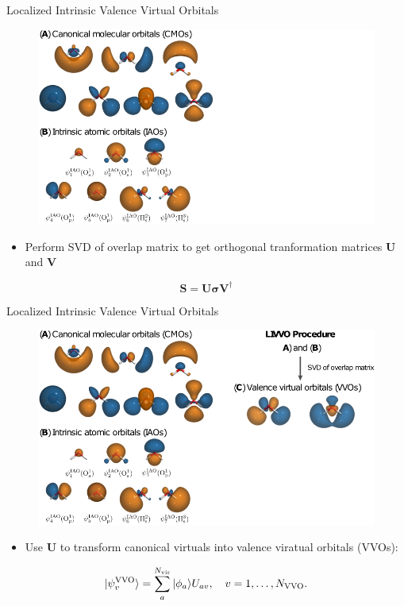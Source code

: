 \documentclass[t]{beamer}
\begin{document}
\begin{frame}{Localized Intrinsic Valence Virtual Orbitals}
\begin{figure}
\includegraphics[width=0.75\linewidth]{livvo_procedure_2.png}
\end{figure}
\begin{itemize}
\item Perform SVD of overlap matrix to get orthogonal tranformation matrices $\mathbf{U}$ and $\mathbf{V}$
\end{itemize}
\begin{equation}
\mathbf{S} = \mathbf{U} \boldsymbol{
\sigma} \mathbf{V}^{\dagger}
\end{equation}
\end{frame}


\begin{frame}{Localized Intrinsic Valence Virtual Orbitals}
\begin{figure}
\includegraphics[width=0.75\linewidth]{livvo_procedure_3.png}
\end{figure}
\begin{itemize}
\item Use $\mathbf{U}$ to transform canonical virtuals into valence viratual orbitals (VVOs):
\end{itemize}
\begin{equation}
| \psi^{\rm VVO}_v \rangle = \sum_a^{N_\mathrm{vir}} | \phi_a \rangle U_{av}, \quad v = 1, \ldots, N_{\rm VVO}.
\end{equation}
\end{frame}
\end{document}
